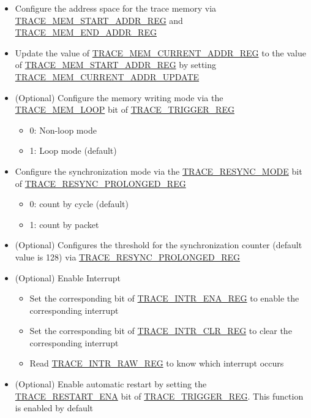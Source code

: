 \documentclass[main\_\_EN.tex]{subfiles}
\begin{document}
\begin{itemize}
    \item Configure the address space for the trace memory via \hyperref[regdesc:TRACEMEMSTARTADDRREG]{TRACE\_MEM\_START\_ADDR\_REG} and \hyperref[regdesc:TRACEMEMENDADDRREG]{TRACE\_MEM\_END\_ADDR\_REG}

    \item Update the value of \hyperref[regdesc:TRACEMEMCURRENTADDRREG]{TRACE\_MEM\_CURRENT\_ADDR\_REG} to the value of \hyperref[regdesc:TRACEMEMSTARTADDRREG]{TRACE\_MEM\_START\_ADDR\_REG} by setting \hyperref[fielddesc:TRACEMEMCURRENTADDRUPDATE]{TRACE\_MEM\_CURRENT\_ADDR\_UPDATE}


    \item (Optional) Configure the memory writing mode via the \hyperref[fielddesc:TRACEMEMLOOP]{TRACE\_MEM\_LOOP} bit of \hyperref[regdesc:TRACETRIGGERREG]{TRACE\_TRIGGER\_REG}
        \begin{itemize}
            \item 0: Non-loop mode
            \item 1: Loop mode (default)
        \end{itemize}

    \item Configure the synchronization mode via the \hyperref[fielddesc:TRACERESYNCMODE]{TRACE\_RESYNC\_MODE} bit of \hyperref[regdesc:TRACERESYNCPROLONGEDREG]{TRACE\_RESYNC\_PROLONGED\_REG}
            \begin{itemize}
                \item 0: count by cycle (default)
                \item 1: count by packet
            \end{itemize}

    \item (Optional) Configures the threshold for the synchronization counter (default value is 128) via \hyperref[regdesc:TRACERESYNCPROLONGEDREG]{TRACE\_RESYNC\_PROLONGED\_REG}


    \item (Optional) Enable Interrupt
        \begin{itemize}
            \item Set the corresponding bit of \hyperref[regdesc:TRACEINTRENAREG]{TRACE\_INTR\_ENA\_REG} to enable the corresponding interrupt
            \item Set the corresponding bit of \hyperref[regdesc:TRACEINTRCLRREG]{TRACE\_INTR\_CLR\_REG} to clear the corresponding interrupt
            \item Read \hyperref[regdesc:TRACEINTRRAWREG]{TRACE\_INTR\_RAW\_REG} to know which interrupt occurs
        \end{itemize}
    \item (Optional) Enable automatic restart by setting the \hyperref[fielddesc:TRACERESTARTENA]{TRACE\_RESTART\_ENA} bit of \hyperref[regdesc:TRACETRIGGERREG]{TRACE\_TRIGGER\_REG}. This function is enabled by default




\end{itemize}
\end{document}
